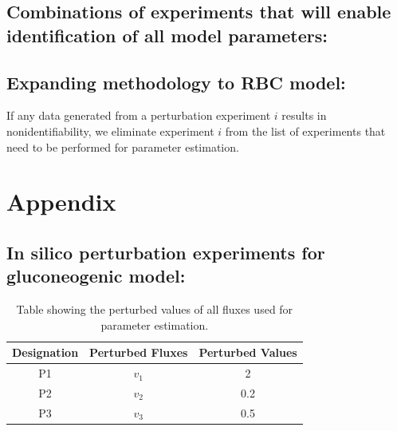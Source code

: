 \documentclass[10pt]{article}
\begin{document}
\subsection{Combinations of experiments that will enable identification of all model parameters:}

\subsection{Expanding methodology to RBC model:}
If any data generated from a perturbation experiment $i$ results in nonidentifiability, we eliminate experiment $i$ from the list of experiments that need to be performed for parameter estimation.

\section*{Appendix}
\subsection*{In silico perturbation experiments for gluconeogenic model:}
\begin{table}[!tbhp]
	\caption{Table showing the perturbed values of all fluxes used for parameter estimation.}
	\begin{center}				
		\begin{tabular}{ccc}
			Designation & Perturbed Fluxes & Perturbed Values\\
			\hline
			P1 & $v_1$ & 2\\
			P2 & $v_2$ & 0.2\\
			P3 & $v_3$ & 0.5
		\end{tabular}
	\end{center}	
	\label{tab:pval}
\end{table}



\printbibliography
\end{document}
